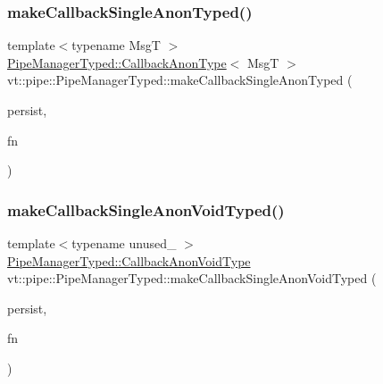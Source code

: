 \mbox{\label{structvt_1_1pipe_1_1_pipe_manager_typed_ab09de6a0f8400e1668d4134d24f51bf3}} 
\subsubsection{\texorpdfstring{make\+Callback\+Single\+Anon\+Typed()}{makeCallbackSingleAnonTyped()}}
{\footnotesize\ttfamily template$<$typename MsgT $>$ \\
\hyperlink{structvt_1_1pipe_1_1_pipe_manager_typed_a3723a2c74fb38e4ad6d7aa546e720ae8}{Pipe\+Manager\+Typed\+::\+Callback\+Anon\+Type}$<$ MsgT $>$ vt\+::pipe\+::\+Pipe\+Manager\+Typed\+::make\+Callback\+Single\+Anon\+Typed (\begin{DoxyParamCaption}\item[{bool const}]{persist,  }\item[{\hyperlink{structvt_1_1pipe_1_1_pipe_manager_base_aa54eee64ab32a27777a672d49eb861f4}{Func\+Msg\+Type}$<$ MsgT $>$}]{fn }\end{DoxyParamCaption})}

\mbox{\label{structvt_1_1pipe_1_1_pipe_manager_typed_a306040a3eaa54799594e9a39d8d0a191}} 
\subsubsection{\texorpdfstring{make\+Callback\+Single\+Anon\+Void\+Typed()}{makeCallbackSingleAnonVoidTyped()}}
{\footnotesize\ttfamily template$<$typename unused\+\_\+ $>$ \\
\hyperlink{structvt_1_1pipe_1_1_pipe_manager_typed_ac17133b080980cbe0bc29b285666b2be}{Pipe\+Manager\+Typed\+::\+Callback\+Anon\+Void\+Type} vt\+::pipe\+::\+Pipe\+Manager\+Typed\+::make\+Callback\+Single\+Anon\+Void\+Typed (\begin{DoxyParamCaption}\item[{bool const}]{persist,  }\item[{\hyperlink{structvt_1_1pipe_1_1_pipe_manager_base_acd6f0c71f38f08d53f85e83b65406d77}{Func\+Void\+Type}}]{fn }\end{DoxyParamCaption})}

